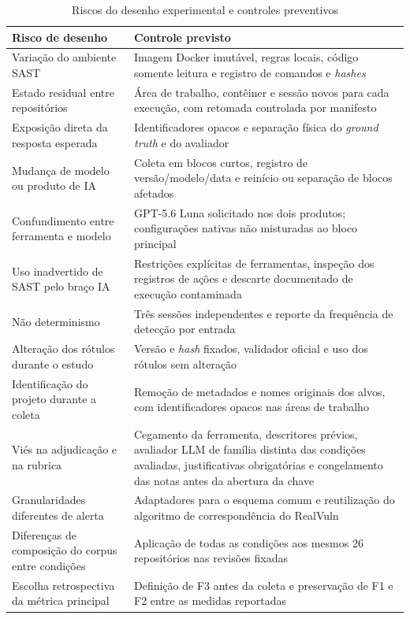 \begin{table}[htb]
\ABNTEXfontereduzida
\caption{\label{tab:ameacas-validade}Riscos do desenho experimental e controles preventivos}
\centering
\begin{tabularx}{\textwidth}{|X|X|}
\hline
\textbf{Risco de desenho} & \textbf{Controle previsto} \\
\hline
Variação do ambiente SAST & Imagem Docker imutável, regras locais, código somente leitura e registro de comandos e \textit{hashes} \\
\hline
Estado residual entre repositórios & Área de trabalho, contêiner e sessão novos para cada execução, com retomada controlada por manifesto \\
\hline
Exposição direta da resposta esperada & Identificadores opacos e separação física do \textit{ground truth} e do avaliador \\
\hline
Mudança de modelo ou produto de IA & Coleta em blocos curtos, registro de versão/modelo/data e reinício ou separação de blocos afetados \\
\hline
Confundimento entre ferramenta e modelo & GPT-5.6 Luna solicitado nos dois produtos; configurações nativas não misturadas ao bloco principal \\
\hline
Uso inadvertido de SAST pelo braço IA & Restrições explícitas de ferramentas, inspeção dos registros de ações e descarte documentado de execução contaminada \\
\hline
Não determinismo & Três sessões independentes e reporte da frequência de detecção por entrada \\
\hline
Alteração dos rótulos durante o estudo & Versão e \textit{hash} fixados, validador oficial e uso dos rótulos sem alteração \\
\hline
Identificação do projeto durante a coleta & Remoção de metadados e nomes originais dos alvos, com identificadores opacos nas áreas de trabalho \\
\hline
Viés na adjudicação e na rubrica & Cegamento da ferramenta, descritores prévios, avaliador LLM de família distinta das condições avaliadas, justificativas obrigatórias e congelamento das notas antes da abertura da chave \\
\hline
Granularidades diferentes de alerta & Adaptadores para o esquema comum e reutilização do algoritmo de correspondência do RealVuln \\
\hline
Diferenças de composição do corpus entre condições & Aplicação de todas as condições aos mesmos 26 repositórios nas revisões fixadas \\
\hline
Escolha retrospectiva da métrica principal & Definição de F3 antes da coleta e preservação de F1 e F2 entre as medidas reportadas \\
\hline
\end{tabularx}
\end{table}

